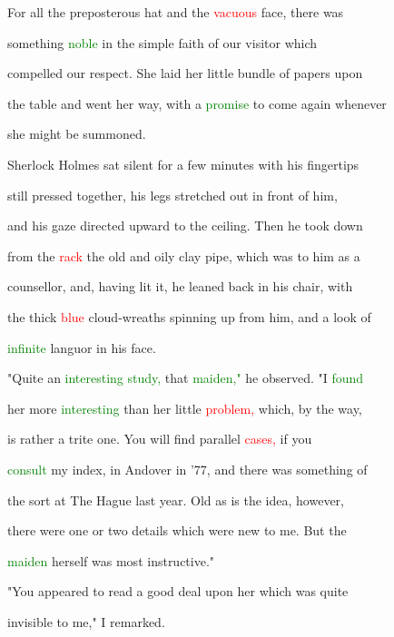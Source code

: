 For all the preposterous hat and the \textcolor{red}{vacuous} face, there was

 something \textcolor{green}{noble} in the simple \textcolor{BurntOrange}{faith} of our \textcolor{BurntOrange}{visitor} which

 compelled our \textcolor{BurntOrange}{respect.} She laid her little bundle of papers upon

 the table and went her way, with a \textcolor{green}{promise} to come again whenever

 she might be summoned.



 Sherlock Holmes sat silent for a few minutes with his fingertips

 still pressed together, his legs stretched out in front of him,

 and his gaze directed upward to the ceiling. Then he took down

 from the \textcolor{red}{rack} the old and oily clay pipe, which was to him as a

 \textcolor{BurntOrange}{counsellor,} and, having lit it, he leaned back in his chair, with

 the thick \textcolor{red}{blue} cloud-wreaths spinning up from him, and a look of

 \textcolor{green}{infinite} languor in his face.



 "Quite an \textcolor{green}{interesting} \textcolor{green}{study,} that \textcolor{green}{maiden,"} he observed. "I \textcolor{green}{found}

 her more \textcolor{green}{interesting} than her little \textcolor{red}{problem,} which, by the way,

 is rather a trite one. You will find parallel \textcolor{red}{cases,} if you

 \textcolor{green}{consult} my index, in Andover in '77, and there was something of

 the sort at The Hague last year. Old as is the idea, however,

 there were one or two details which were new to me. But the

 \textcolor{green}{maiden} herself was most instructive."



 "You appeared to read a \textcolor{BurntOrange}{good} \textcolor{BurntOrange}{deal} upon her which was quite

 invisible to me," I remarked.



